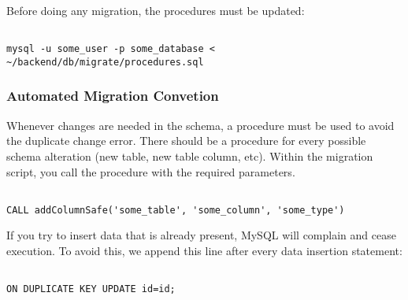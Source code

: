 Before doing any migration, the procedures must be updated:

\begin{listing}[H]
\begin{verbatim}

mysql -u some_user -p some_database < ~/backend/db/migrate/procedures.sql

\end{verbatim}
\label{lst:updating-sql-procedures}
\end{listing}

\subsubsection{Automated Migration Convetion}
\label{subsubsec:automated-migration-convention}

Whenever changes are needed in the schema, a procedure must be used to avoid the duplicate change error. There should be a procedure for every possible schema alteration (new table, new table column, etc). Within the migration script, you call the procedure with the required parameters. 

\begin{listing}[H]
\begin{verbatim}

CALL addColumnSafe('some_table', 'some_column', 'some_type')

\end{verbatim}
\label{lst:calling-an-sql-procedure}
\end{listing}

If you try to insert data that is already present, MySQL will complain and cease execution. To avoid this, we append this line after every data insertion statement:

\begin{listing}[H]
\begin{verbatim}

ON DUPLICATE KEY UPDATE id=id;

\end{verbatim}
\label{lst:avoiding-duplicate-data-insertion-errors}
\end{listing}

